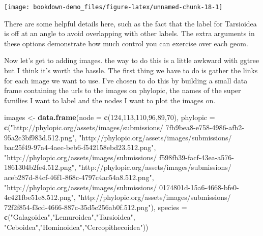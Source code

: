 \documentclass[]{book}
\newenvironment{Shaded}{\begin{snugshade}}{\end{snugshade}}
\newcommand{\KeywordTok}[1]{\textcolor[rgb]{0.13,0.29,0.53}{\textbf{#1}}}
\newcommand{\DataTypeTok}[1]{\textcolor[rgb]{0.13,0.29,0.53}{#1}}
\newcommand{\DecValTok}[1]{\textcolor[rgb]{0.00,0.00,0.81}{#1}}
\newcommand{\StringTok}[1]{\textcolor[rgb]{0.31,0.60,0.02}{#1}}
\newcommand{\NormalTok}[1]{#1}
\begin{document}
\begin{center}\texttt{[image: bookdown-demo\_files/figure-latex/unnamed-chunk-18-1]} \end{center}

There are some helpful details here, such as the fact that the label for
Tarsioidea is off at an angle to avoid overlapping with other labels.
The extra arguments in these options demonstrate how much control you
can exercise over each geom.

Now let's get to adding images. the way to do this is a little awkward
with ggtree but I think it's worth the hassle. The first thing we have
to do is gather the links for each image we want to use. I've chosen to
do this by building a small data frame containing the urls to the images
on phylopic, the names of the super families I want to label and the
nodes I want to plot the images on.

\begin{Shaded}
\begin{Highlighting}[]
\NormalTok{images <-}\StringTok{ }\KeywordTok{data.frame}\NormalTok{(}\DataTypeTok{node =} \KeywordTok{c}\NormalTok{(}\DecValTok{124}\NormalTok{,}\DecValTok{113}\NormalTok{,}\DecValTok{110}\NormalTok{,}\DecValTok{96}\NormalTok{,}\DecValTok{89}\NormalTok{,}\DecValTok{70}\NormalTok{),}
                     \DataTypeTok{phylopic =} \KeywordTok{c}\NormalTok{(}\StringTok{"http://phylopic.org/assets/images/submissions/}
\StringTok{                                  7fb9bea8-e758-4986-afb2-95a2c3bf983d.512.png"}\NormalTok{,}
                                  \StringTok{"http://phylopic.org/assets/images/submissions/}
\StringTok{                                  bac25f49-97a4-4aec-beb6-f542158ebd23.512.png"}\NormalTok{,}
                                  \StringTok{"http://phylopic.org/assets/images/submissions/}
\StringTok{                                  f598fb39-facf-43ea-a576-1861304b2fe4.512.png"}\NormalTok{,}
                                  \StringTok{"http://phylopic.org/assets/images/submissions/}
\StringTok{                                  aceb287d-84cf-46f1-868c-4797c4ac54a8.512.png"}\NormalTok{,}
                                  \StringTok{"http://phylopic.org/assets/images/submissions/}
\StringTok{                                  0174801d-15a6-4668-bfe0-4c421fbe51e8.512.png"}\NormalTok{,}
                                  \StringTok{"http://phylopic.org/assets/images/submissions/}
\StringTok{                                  72f2f854-f3cd-4666-887c-35d5c256ab0f.512.png"}\NormalTok{),}
                     \DataTypeTok{species =} \KeywordTok{c}\NormalTok{(}\StringTok{"Galagoidea"}\NormalTok{,}\StringTok{"Lemuroidea"}\NormalTok{,}\StringTok{"Tarsioidea"}\NormalTok{,}
                                 \StringTok{"Ceboidea"}\NormalTok{,}\StringTok{"Hominoidea"}\NormalTok{,}\StringTok{"Cercopithecoidea"}\NormalTok{))}
\end{Highlighting}
\end{Shaded}
\end{document}
